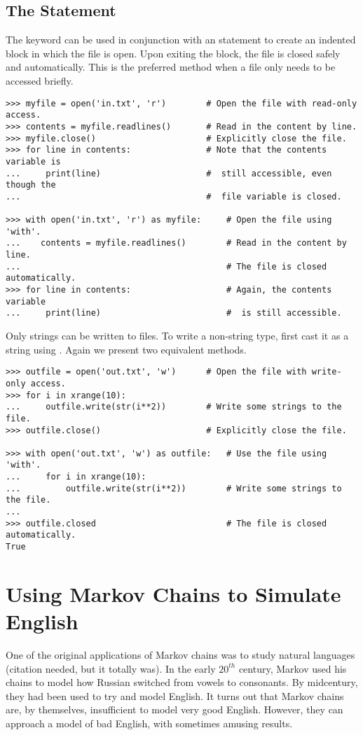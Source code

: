 \subsection*{The  Statement}

The keyword  can be used in conjunction with an  statement to create an indented block in which the file is open.
Upon exiting the block, the file is closed safely and automatically.
This is the preferred method when a file only needs to be accessed briefly.

\begin{lstlisting}
>>> myfile = open('in.txt', 'r')		# Open the file with read-only access.
>>> contents = myfile.readlines()		# Read in the content by line.
>>> myfile.close()						# Explicitly close the file.
>>> for line in contents: 				# Note that the contents variable is
...		print(line) 					#  still accessible, even though the 
... 									#  file variable is closed.

>>> with open('in.txt', 'r') as myfile: 	# Open the file using 'with'.
...    contents = myfile.readlines() 		# Read in the content by line.
... 										# The file is closed automatically.
>>> for line in contents:					# Again, the contents variable
...		print(line) 						#  is still accessible.
\end{lstlisting}

Only strings can be written to files.
To write a non-string type, first cast it as a string using .
Again we present two equivalent methods.
\begin{lstlisting}
>>> outfile = open('out.txt', 'w') 		# Open the file with write-only access.
>>> for i in xrange(10):
...		outfile.write(str(i**2))		# Write some strings to the file.
>>> outfile.close()						# Explicitly close the file.

>>> with open('out.txt', 'w') as outfile: 	# Use the file using 'with'.
... 	for i in xrange(10): 				
... 		outfile.write(str(i**2)) 		# Write some strings to the file.
...
>>> outfile.closed 							# The file is closed automatically.
True
\end{lstlisting}

\section*{Using Markov Chains to Simulate English}

One of the original applications of Markov chains was to study natural languages (citation needed, but it totally was).
In the early $20^{th}$ century, Markov used his chains to model how Russian switched from vowels to consonants.
By midcentury, they had been used to try and model English.
It turns out that Markov chains are, by themselves, insufficient to model very good English.
However, they can approach a model of bad English, with sometimes amusing results.


